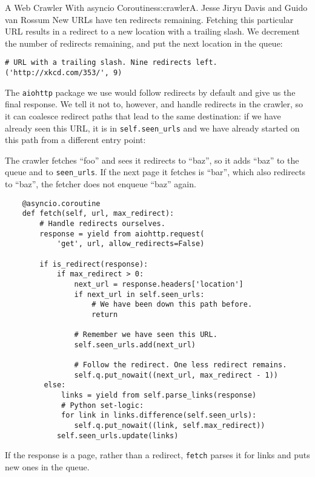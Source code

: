 \begin{aosachapter}{A Web Crawler With asyncio Coroutines}{s:crawler}{A. Jesse Jiryu Davis and Guido van Rossum}
New URLs have ten redirects remaining. Fetching this particular URL
results in a redirect to a new location with a trailing slash. We
decrement the number of redirects remaining, and put the next location
in the queue:

\begin{verbatim}
# URL with a trailing slash. Nine redirects left.
('http://xkcd.com/353/', 9)
\end{verbatim}

The \texttt{aiohttp} package we use would follow redirects by default
and give us the final response. We tell it not to, however, and handle
redirects in the crawler, so it can coalesce redirect paths that lead to
the same destination: if we have already seen this URL, it is in
\texttt{self.seen\_urls} and we have already started on this path from a
different entry point:


The crawler fetches ``foo'' and sees it redirects to ``baz'', so it adds
``baz'' to the queue and to \texttt{seen\_urls}. If the next page it
fetches is ``bar'', which also redirects to ``baz'', the fetcher does
not enqueue ``baz'' again.

\begin{verbatim}
    @asyncio.coroutine
    def fetch(self, url, max_redirect):
        # Handle redirects ourselves.
        response = yield from aiohttp.request(
            'get', url, allow_redirects=False)

        if is_redirect(response):
            if max_redirect > 0:
                next_url = response.headers['location']
                if next_url in self.seen_urls:
                    # We have been down this path before.
                    return

                # Remember we have seen this URL.
                self.seen_urls.add(next_url)
                
                # Follow the redirect. One less redirect remains.
                self.q.put_nowait((next_url, max_redirect - 1))
         else:
             links = yield from self.parse_links(response)
             # Python set-logic:
             for link in links.difference(self.seen_urls):
                self.q.put_nowait((link, self.max_redirect))
            self.seen_urls.update(links)
\end{verbatim}

If the response is a page, rather than a redirect, \texttt{fetch} parses
it for links and puts new ones in the queue.


\end{aosachapter}
